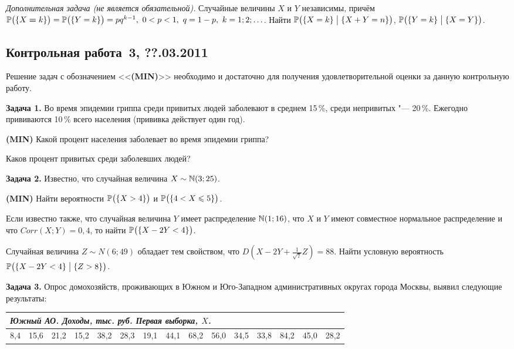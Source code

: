 \documentclass[pdftex,12pt,a4paper]{article}
\newenvironment{enumerate*}{
\begin{enumerate}
  \setlength{\itemsep}{0pt}
  \setlength{\parskip}{0pt}
  \setlength{\parsep}{0pt}
}{\end{enumerate}}
\newcommand{\MIN}{\textbf{(MIN)}{}}
\begin{document}
\emph{Дополнительная задача (не является обязательной).} Случайные величины $X$ и $Y$ независимы, причём $\mathbb{P}\bigl(\{X\hm=k\}\bigr)=\mathbb{P}\bigl(\{Y=k\}\bigr)=pq^{k-1},\ 0<p<1,\ q=1-p,\ k=1;2;\ldots$. Найти $\mathbb{P}\bigl(\{X=k\} \bigm| \{X+Y=n\}\bigr)$, $\mathbb{P}\bigl(\{Y=k\}\bigm| \{X=Y\}\bigr)$.
\newpage

\subsection{Контрольная работа \No\,3, ??.03.2011}

Решение задач с обозначением <<\MIN{}>> необходимо и достаточно для получения удовлетворительной оценки за данную контрольную работу.\par\smallskip

\textbf{Задача 1.} Во время эпидемии гриппа среди привитых людей заболевают в среднем 15\,\%, среди непривитых "--- 20\,\%. Ежегодно прививаются 10\,\% всего населения (прививка действует один год).
\begin{enumerate*}
\item \MIN{} Какой процент населения заболевает во время эпидемии гриппа?
\item Каков процент привитых среди заболевших людей?
\end{enumerate*}

\textbf{Задача 2.} Известно, что случайная величина $X\sim\N(3;25)$.
\begin{enumerate*}
\item \MIN{} Найти вероятности $\P\bigl(\{X>4\}\bigr)$ и $\P\bigl(\{4<X\leqslant 5\}\bigr)$.
\item Если известно также, что случайная величина $Y$ имеет распределение $\N(1;16)$, что $X$ и $Y$ имеют совместное нормальное распределение и что $Corr(X;Y)=0{,}4$, то найти $\P\bigl(\{X-2Y<4\}\bigr)$.
\item Случайная величина $Z\sim N(6;49)$ обладает тем свойством, что $D\left(X-2Y+\frac{1}{\sqrt{7}}Z\right)=88$. Найти условную вероятность $\P\bigl(\{X-2Y<4\} \bigm| \{Z>8\}\bigr)$.
\end{enumerate*}

\textbf{Задача 3.} Опрос домохозяйств, проживающих в Южном и Юго-Западном административных округах города Москвы, выявил следующие результаты:
\par\smallskip
\begin{tabular}{|p{6mm}|p{6mm}|p{6mm}|p{6mm}|p{6mm}|p{6mm}|p{6mm}|p{6mm}|p{6mm}|p{6mm}|p{6mm}|p{6mm}|p{6mm}|p{6mm}|p{6mm}|}
\multicolumn{15}{l}{\emph{Южный АО. Доходы, тыс. руб. Первая выборка, $X$.}}\\ \hline
8{,}4 & 15{,}6 & 21{,}2 & 15{,}2 & 38{,}2 & 28{,}3 & 19{,}1 & 44{,}1 & 68{,}2 & 56{,}0 & 34{,}5 & 33{,}8 & 84{,}2 & 45{,}0 & 28{,}2 \\ \hline
\end{tabular}\par\smallskip
\end{document}
